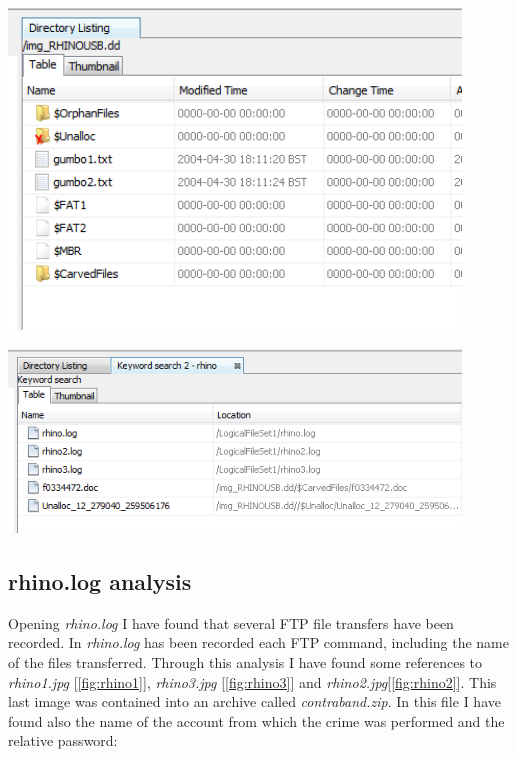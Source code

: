 \documentclass{article}
\begin{document}
\begin{minipage}[t]{0.45\textwidth}
	\centering
	\vspace{0.5cm}
	\includegraphics[width=0.9\textwidth]{img/rhinousb_root.png}
	\vspace{1cm}
	\label{fig:rhino_root}
\end{minipage}
\hspace{0.5cm}
\begin{minipage}[t]{0.45\textwidth}
	\centering
	\vspace{0.5cm}
	\includegraphics[width=0.9\textwidth]{img/rhino_search.png}
	\vspace{1cm}
	\label{fig:rhino_search}
\end{minipage}

\subsection{rhino.log analysis}
Opening \textit{rhino.log} I have found that several FTP file transfers have been recorded.
In \textit{rhino.log} has been recorded each FTP command, including the name of the files transferred.
Through this analysis I have found some references to \textit{rhino1.jpg} [\autoref{fig:rhino1}], \textit{rhino3.jpg} [\autoref{fig:rhino3}] and \textit{rhino2.jpg}[\autoref{fig:rhino2}].
This last image was contained into an archive called \textit{contraband.zip}.
In this file I have found also the name of the account from which the crime was performed and the relative password:
\end{document}
